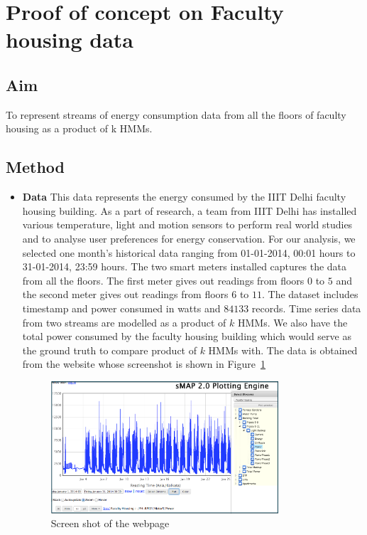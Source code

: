 \documentclass{sig-alternate}
\begin{document}

\section{Proof of concept on Faculty housing data}
\label{sec:faculty}

\subsection{ Aim } To represent streams of energy consumption data from all the floors of faculty housing as a product of k HMMs. 
\subsection{Method}
\begin{itemize}
\item \textbf{ Data } This data represents the energy consumed by the IIIT Delhi faculty housing building. As a part of research, a team from IIIT Delhi has installed various temperature, light and motion sensors to perform real world studies and to analyse user preferences for energy conservation. For our analysis, we selected one month's historical data ranging from 01-01-2014, 00:01 hours to 31-01-2014, 23:59 hours. The two smart meters installed captures the data from all the floors. The first meter gives out readings from floors $0$ to $5$ and the second meter gives out readings from floors $6$ to $11$. The dataset includes timestamp and power consumed in watts and $84133$ records. Time series data from two streams are modelled as a product of $k$ HMMs. We also have the total power consumed by the faculty housing building which would serve as the ground truth to compare product of $k$ HMMs with. The data is obtained from the website whose screenshot is shown in Figure~\ref{fig:screenshot}

\begin{figure}[t]
\centering
\includegraphics[width=0.8\textwidth,height=0.35\textheight]{screenshot.png}
\caption{Screen shot of the webpage}
\label{fig:screenshot}
\end{figure}


\end{itemize}
\end{document}
